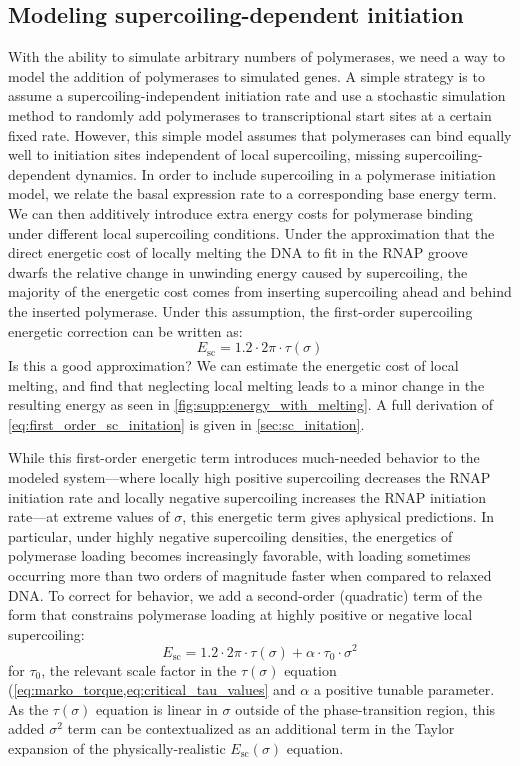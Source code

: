 \documentclass[11pt]{article}
\begin{document}
\subsection{Modeling supercoiling-dependent initiation}
With the ability to simulate arbitrary numbers of polymerases, we need a way to model the addition of polymerases to simulated genes. A simple strategy is to assume a supercoiling-independent initiation rate and use a stochastic simulation method to randomly add polymerases to transcriptional start sites at a certain fixed rate. However, this simple model assumes that polymerases can bind equally well to initiation sites independent of local supercoiling, missing supercoiling-dependent dynamics. In order to include supercoiling in a polymerase initiation model, we relate the basal expression rate to a corresponding base energy term. We can then additively introduce extra energy costs for polymerase binding under different local supercoiling conditions. Under the approximation that the direct energetic cost of locally melting the DNA to fit in the RNAP groove dwarfs the relative change in unwinding energy caused by supercoiling, the majority of the energetic cost comes from inserting supercoiling ahead and behind the inserted polymerase. Under this assumption, the first-order supercoiling energetic correction can be written as:
\begin{equation}
    E_\text{sc} = 1.2  \cdot 2\pi \cdot \tau(\sigma)
\label{eq:first_order_sc_initation}
\end{equation}
 Is this a good approximation? We can estimate the energetic cost of local melting, and find that neglecting local melting leads to a minor change in the resulting energy as seen in \cref{fig:supp:energy_with_melting}. A full derivation of \cref{eq:first_order_sc_initation} is given in \cref{sec:sc_initation}.

While this first-order energetic term introduces much-needed behavior to the modeled system---where locally high positive supercoiling decreases the RNAP initiation rate and locally negative supercoiling increases the RNAP initiation rate---at extreme values of \(\sigma\), this energetic term gives aphysical predictions. In particular, under highly negative supercoiling densities, the energetics of polymerase loading becomes increasingly favorable, with loading sometimes occurring more than two orders of magnitude faster when compared to relaxed DNA. To correct for behavior, we add a second-order (quadratic) term of the form that constrains polymerase loading at highly positive or negative local supercoiling:
\begin{equation}
    E_\text{sc} = 1.2  \cdot 2\pi \cdot \tau(\sigma) + \alpha \cdot \tau_0 \cdot \sigma^2
\label{eq:second_order_sc_initation}
\end{equation}
for \(\tau_0\), the relevant scale factor in the \(\tau(\sigma)\) equation (\cref{eq:marko_torque,eq:critical_tau_values} \parencite{markoTorqueDynamicsLinking2007} and \(\alpha\) a positive tunable parameter. As the \(\tau(\sigma)\) equation is linear in \(\sigma\) outside of the phase-transition region, this added \(\sigma^2\) term can be contextualized as an additional term in the Taylor expansion of the physically-realistic \(E_\text{sc}(\sigma)\) equation.
\end{document}
